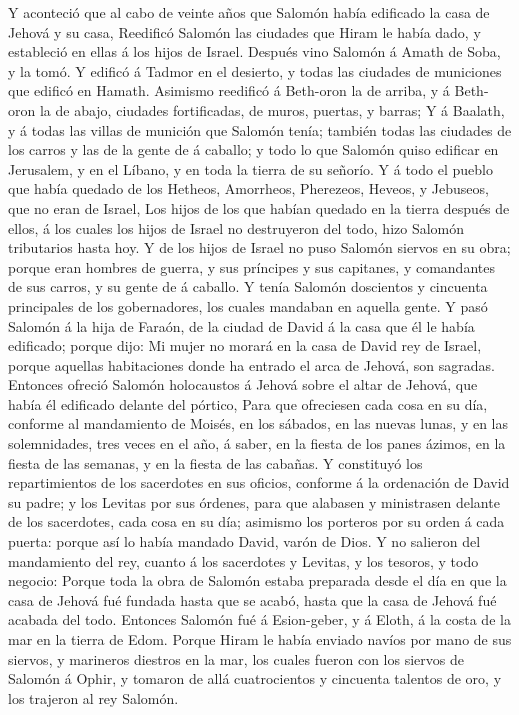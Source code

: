  Y aconteció que al cabo de veinte años que Salomón había
edificado la casa de Jehová y su casa,  Reedificó Salomón
las ciudades que Hiram le había dado, y estableció en ellas á los hijos
de Israel.  Después vino Salomón á Amath de Soba, y la tomó.
 Y edificó á Tadmor en el desierto, y todas las ciudades de
municiones que edificó en Hamath.  Asimismo reedificó á
Beth-oron la de arriba, y á Beth-oron la de abajo, ciudades
fortificadas, de muros, puertas, y barras;  Y á Baalath, y á
todas las villas de munición que Salomón tenía; también todas las
ciudades de los carros y las de la gente de á caballo; y todo lo que
Salomón quiso edificar en Jerusalem, y en el Líbano, y en toda la tierra
de su señorío.  Y á todo el pueblo que había quedado de los
Hetheos, Amorrheos, Pherezeos, Heveos, y Jebuseos, que no eran de
Israel,  Los hijos de los que habían quedado en la tierra
después de ellos, á los cuales los hijos de Israel no destruyeron del
todo, hizo Salomón tributarios hasta hoy.  Y de los hijos de
Israel no puso Salomón siervos en su obra; porque eran hombres de
guerra, y sus príncipes y sus capitanes, y comandantes de sus carros, y
su gente de á caballo.  Y tenía Salomón doscientos y
cincuenta principales de los gobernadores, los cuales mandaban en
aquella gente.  Y pasó Salomón á la hija de Faraón, de la
ciudad de David á la casa que él le había edificado; porque dijo: Mi
mujer no morará en la casa de David rey de Israel, porque aquellas
habitaciones donde ha entrado el arca de Jehová, son sagradas.
 Entonces ofreció Salomón holocaustos á Jehová sobre el
altar de Jehová, que había él edificado delante del pórtico,
 Para que ofreciesen cada cosa en su día, conforme al
mandamiento de Moisés, en los sábados, en las nuevas lunas, y en las
solemnidades, tres veces en el año, á saber, en la fiesta de los panes
ázimos, en la fiesta de las semanas, y en la fiesta de las cabañas.
 Y constituyó los repartimientos de los sacerdotes en sus
oficios, conforme á la ordenación de David su padre; y los Levitas por
sus órdenes, para que alabasen y ministrasen delante de los sacerdotes,
cada cosa en su día; asimismo los porteros por su orden á cada puerta:
porque así lo había mandado David, varón de Dios.  Y no
salieron del mandamiento del rey, cuanto á los sacerdotes y Levitas, y
los tesoros, y todo negocio:  Porque toda la obra de
Salomón estaba preparada desde el día en que la casa de Jehová fué
fundada hasta que se acabó, hasta que la casa de Jehová fué acabada del
todo.  Entonces Salomón fué á Esion-geber, y á Eloth, á la
costa de la mar en la tierra de Edom.  Porque Hiram le
había enviado navíos por mano de sus siervos, y marineros diestros en la
mar, los cuales fueron con los siervos de Salomón á Ophir, y tomaron de
allá cuatrocientos y cincuenta talentos de oro, y los trajeron al rey
Salomón.

